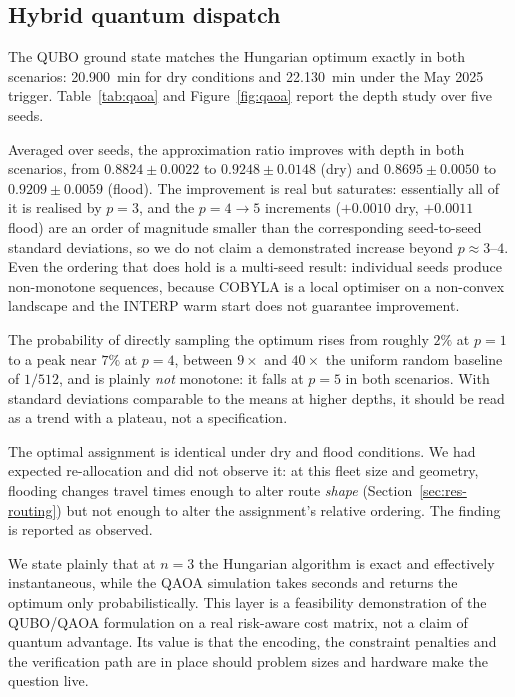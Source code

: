 \documentclass[journal]{IEEEtran}
\begin{document}
\subsection{Hybrid quantum dispatch}
\label{sec:res-qaoa}

The QUBO ground state matches the Hungarian optimum exactly in both scenarios:
\SI{20.900}{\minute} for dry conditions and \SI{22.130}{\minute} under the
May 2025 trigger. Table~\ref{tab:qaoa} and Figure~\ref{fig:qaoa} report the depth
study over five seeds.

Averaged over seeds, the approximation ratio improves with depth in both
scenarios, from $0.8824\pm0.0022$ to $0.9248\pm0.0148$ (dry) and
$0.8695\pm0.0050$ to $0.9209\pm0.0059$ (flood). The improvement is real but
saturates: essentially all of it is realised by $p=3$, and the $p=4\to5$
increments ($+0.0010$ dry, $+0.0011$ flood) are an order of magnitude smaller
than the corresponding seed-to-seed standard deviations, so we do not claim a
demonstrated increase beyond $p\approx3$--$4$. Even the ordering that does hold
is a multi-seed result: individual seeds produce non-monotone sequences, because
COBYLA is a local optimiser on a non-convex landscape and the INTERP warm start
does not guarantee improvement.

The probability of directly sampling the optimum rises from roughly $2\%$ at
$p=1$ to a peak near $7\%$ at $p=4$, between $9\times$ and $40\times$ the uniform
random baseline of $1/512$, and is plainly \emph{not} monotone: it falls at $p=5$
in both scenarios. With standard deviations comparable to the means at higher
depths, it should be read as a trend with a plateau, not a specification.

The optimal assignment is identical under dry and flood conditions. We had
expected re-allocation and did not observe it: at this fleet size and geometry,
flooding changes travel times enough to alter route \emph{shape}
(Section~\ref{sec:res-routing}) but not enough to alter the assignment's relative
ordering. The finding is reported as observed.

We state plainly that at $n=3$ the Hungarian algorithm is exact and effectively
instantaneous, while the QAOA simulation takes seconds and returns the optimum
only probabilistically. This layer is a feasibility demonstration of the
QUBO/QAOA formulation on a real risk-aware cost matrix, not a claim of quantum
advantage. Its value is that the encoding, the constraint penalties and the
verification path are in place should problem sizes and hardware make the
question live.
\end{document}
